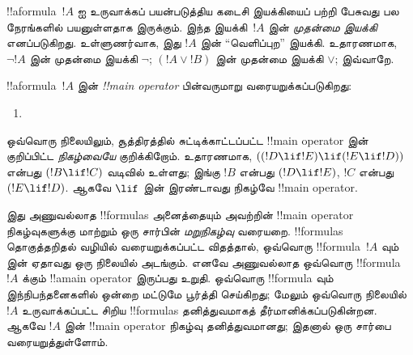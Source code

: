 \documentclass[../../../include/open-logic-section]{subfiles}
\begin{document}


\begin{explain}
!!a{formula}~$!A$ ஐ உருவாக்கப் பயன்படுத்திய கடைசி இயக்கியைப் பற்றி பேசுவது
பல நேரங்களில் பயனுள்ளதாக இருக்கும். இந்த இயக்கி~$!A$ இன் \emph{முதன்மை
இயக்கி} எனப்படுகிறது. உள்ளுணர்வாக, இது $!A$ இன் ``வெளிப்புற'' இயக்கி.
உதாரணமாக, $\lnot !A$ இன் முதன்மை இயக்கி $\lnot$; $(!A \lor !B)$ இன்
முதன்மை இயக்கி $\lor$; இவ்வாறே.
\end{explain}

\begin{defn}
!!a{formula}~$!A$ இன் \emph{!!{main operator}} பின்வருமாறு வரையறுக்கப்படுகிறது:
\begin{enumerate}
\item {}







\end{enumerate}
\end{defn}

ஒவ்வொரு நிலையிலும், சூத்திரத்தில் சுட்டிக்காட்டப்பட்ட !!{main operator} இன்
குறிப்பிட்ட \emph{நிகழ்வையே} குறிக்கிறோம். உதாரணமாக,
$((!D \lif !E) \lif (!E \lif !D))$ என்பது $(!B \lif !C)$ வடிவில் உள்ளது;
இங்கு $!B$ என்பது $(!D \lif !E)$, $!C$ என்பது $(!E \lif !D)$. ஆகவே
$\lif$ இன் இரண்டாவது நிகழ்வே !!{main operator}.

\begin{explain}
இது அணுவல்லாத !!{formula}s அனைத்தையும் அவற்றின் !!{main operator}
நிகழ்வுகளுக்கு மாற்றும் ஒரு சார்பின் \emph{மறுநிகழ்வு} வரையறை. !!{formula}s
தொகுத்தறிதல் வழியில் வரையறுக்கப்பட்ட விதத்தால், ஒவ்வொரு !!{formula}~$!A$ வும்
 இன் ஏதாவது ஒரு நிலையில் அடங்கும். எனவே அணுவல்லாத
ஒவ்வொரு !!{formula}~$!A$ க்கும் !!a{main
  operator} இருப்பது உறுதி.
ஒவ்வொரு !!{formula} வும் இந்நிபந்தனைகளில் ஒன்றை மட்டுமே பூர்த்தி செய்கிறது;
மேலும் ஒவ்வொரு நிலையில் $!A$ உருவாக்கப்பட்ட சிறிய !!{formula}s தனித்துவமாகத்
தீர்மானிக்கப்படுகின்றன. ஆகவே $!A$ இன் !!{main
  operator} நிகழ்வு தனித்துவமானது;
இதனால் ஒரு சார்பை வரையறுத்துள்ளோம்.
\end{explain}
\end{document}
